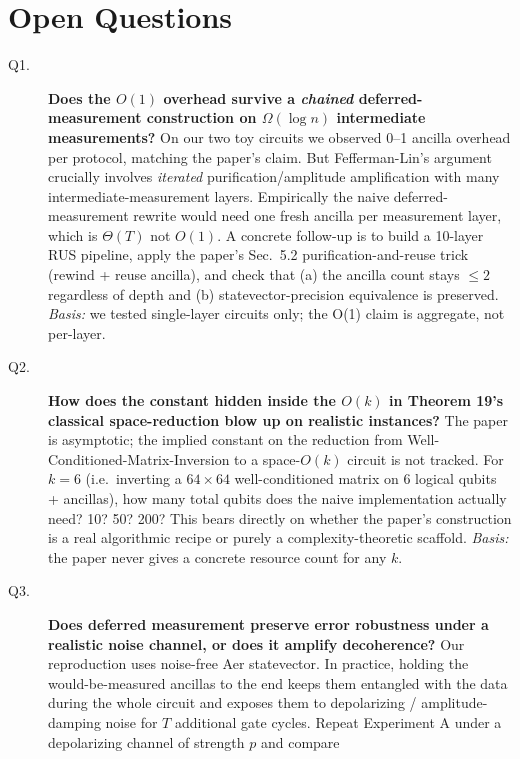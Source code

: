 \section{Open Questions}\label{sec:oq}
\begin{description}
  \item[Q1.] \textbf{Does the $O(1)$ overhead survive a \emph{chained} deferred-measurement
        construction on $\Omega(\log n)$ intermediate measurements?}  On our two toy circuits
        we observed 0--1 ancilla overhead per protocol, matching the paper's claim.  But
        Fefferman-Lin's argument crucially involves \emph{iterated} purification/amplitude
        amplification with many intermediate-measurement layers.  Empirically the naive
        deferred-measurement rewrite would need one fresh ancilla per measurement layer,
        which is $\Theta(T)$ not $O(1)$.  A concrete follow-up is to build a 10-layer RUS
        pipeline, apply the paper's Sec.~5.2 purification-and-reuse trick (rewind + reuse
        ancilla), and check that (a) the ancilla count stays $\le 2$ regardless of depth
        and (b) statevector-precision equivalence is preserved.
        \textit{Basis:} we tested single-layer circuits only; the O(1) claim is aggregate,
        not per-layer.
  \item[Q2.] \textbf{How does the constant hidden inside the $O(k)$ in Theorem 19's classical
        space-reduction blow up on realistic instances?}  The paper is asymptotic; the
        implied constant on the reduction from Well-Conditioned-Matrix-Inversion to a
        space-$O(k)$ circuit is not tracked.  For $k=6$ (i.e.\ inverting a $64\times 64$
        well-conditioned matrix on 6 logical qubits + ancillas), how many total qubits does
        the naive implementation actually need?  10?  50?  200?  This bears directly on
        whether the paper's construction is a real algorithmic recipe or purely a
        complexity-theoretic scaffold.
        \textit{Basis:} the paper never gives a concrete resource count for any $k$.
  \item[Q3.] \textbf{Does deferred measurement preserve error robustness under a realistic
        noise channel, or does it amplify decoherence?}  Our reproduction uses noise-free
        Aer statevector.  In practice, holding the would-be-measured ancillas to the end
        keeps them entangled with the data during the whole circuit and exposes them to
        depolarizing / amplitude-damping noise for $T$ additional gate cycles.  Repeat
        Experiment A under a depolarizing channel of strength $p$ and compare

\end{description}
